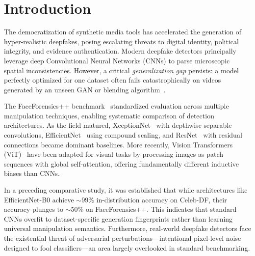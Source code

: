 \documentclass[runningheads]{llncs}
\begin{document}

\section{Introduction}
The democratization of synthetic media tools has accelerated the generation of hyper-realistic deepfakes, posing escalating threats to digital identity, political integrity, and evidence authentication. Modern deepfake detectors principally leverage deep Convolutional Neural Networks (CNNs) to parse microscopic spatial inconsistencies. However, a critical \textit{generalization gap} persists: a model perfectly optimized for one dataset often fails catastrophically on videos generated by an unseen GAN or blending algorithm~\cite{cross_dataset}.

The FaceForensics++ benchmark~\cite{faceforensics} standardized evaluation across multiple manipulation techniques, enabling systematic comparison of detection architectures. As the field matured, XceptionNet~\cite{xception} with depthwise separable convolutions, EfficientNet~\cite{efficientnet} using compound scaling, and ResNet~\cite{resnet} with residual connections became dominant baselines. More recently, Vision Transformers (ViT)~\cite{vit} have been adapted for visual tasks by processing images as patch sequences with global self-attention, offering fundamentally different inductive biases than CNNs.

In a preceding comparative study, it was established that while architectures like EfficientNet-B0 achieve $\sim$99\% in-distribution accuracy on Celeb-DF, their accuracy plunges to $\sim$50\% on FaceForensics++. This indicates that standard CNNs overfit to dataset-specific generation fingerprints rather than learning universal manipulation semantics. Furthermore, real-world deepfake detectors face the existential threat of adversarial perturbations---intentional pixel-level noise designed to fool classifiers---an area largely overlooked in standard benchmarking.
\end{document}
